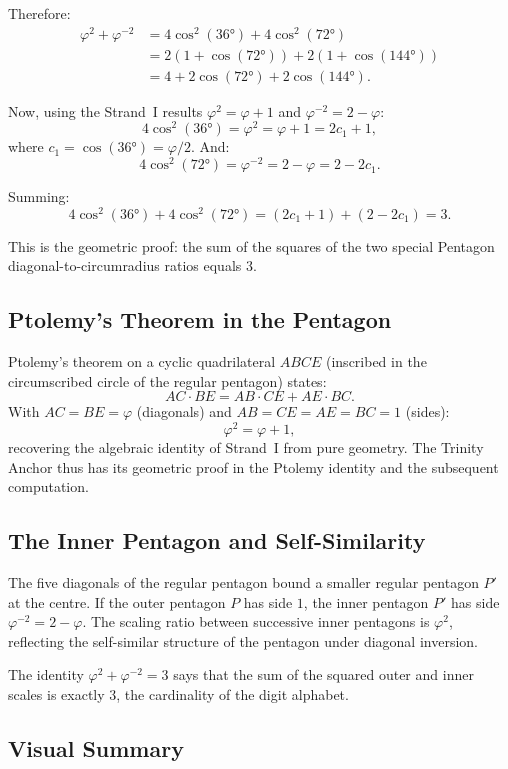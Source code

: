 Therefore:
\begin{align*}
  \varphi^{2}+\varphi^{-2}
  &= 4\cos^{2}(36°) + 4\cos^{2}(72°)\\
  &= 2(1+\cos(72°)) + 2(1+\cos(144°))\\
  &= 4 + 2\cos(72°) + 2\cos(144°).
\end{align*}

Now, using the Strand~I results $\varphi^{2}=\varphi+1$ and
$\varphi^{-2}=2-\varphi$:
\[
  4\cos^{2}(36°) = \varphi^{2} = \varphi + 1 = 2c_{1}+1,
\]
where $c_{1} = \cos(36°) = \varphi/2$. And:
\[
  4\cos^{2}(72°) = \varphi^{-2} = 2-\varphi = 2-2c_{1}.
\]

Summing:
\[
  4\cos^{2}(36°) + 4\cos^{2}(72°)
  = (2c_{1}+1) + (2-2c_{1})
  = 3.
\]

This is the geometric proof: the sum of the squares of the two
special Pentagon diagonal-to-circumradius ratios equals $3$.

\subsection{Ptolemy's Theorem in the Pentagon}

Ptolemy's theorem on a cyclic quadrilateral $ABCE$
(inscribed in the circumscribed circle of the regular pentagon)
states:
\[
  AC \cdot BE = AB \cdot CE + AE \cdot BC.
\]
With $AC = BE = \varphi$ (diagonals) and
$AB = CE = AE = BC = 1$ (sides):
\[
  \varphi^{2} = \varphi + 1,
\]
recovering the algebraic identity of Strand~I from pure geometry.
The Trinity Anchor thus has its geometric proof in the Ptolemy
identity and the subsequent computation.

\subsection{The Inner Pentagon and Self-Similarity}

The five diagonals of the regular pentagon bound a smaller regular
pentagon $P'$ at the centre.
If the outer pentagon $P$ has side $1$, the inner pentagon $P'$
has side $\varphi^{-2} = 2-\varphi$.
The scaling ratio between successive inner pentagons is $\varphi^{2}$,
reflecting the self-similar structure of the pentagon under
diagonal inversion.

The identity $\varphi^{2}+\varphi^{-2}=3$ says that the sum
of the squared outer and inner scales is exactly $3$, the
cardinality of the digit alphabet.

\subsection{Visual Summary}

